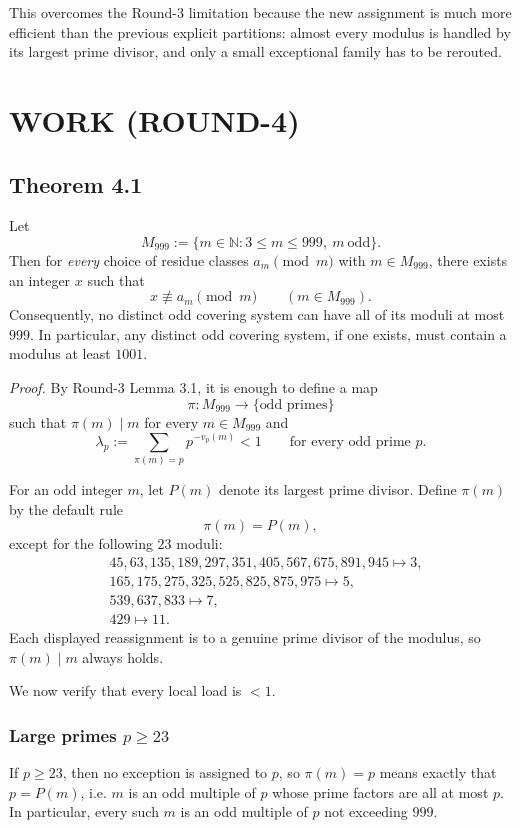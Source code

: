 This overcomes the Round-3 limitation because the new assignment is much more efficient than the previous explicit partitions: almost every modulus is handled by its largest prime divisor, and only a small exceptional family has to be rerouted.

\section{WORK (ROUND-4)}

\subsection*{Theorem 4.1}
Let
\[
M_{999}:=\{m\in \mathbb N : 3\le m\le 999,\ m\ \text{odd}\}.
\]
Then for \emph{every} choice of residue classes \(a_m \pmod m\) with \(m\in M_{999}\), there exists an integer \(x\) such that
\[
x \not\equiv a_m \pmod m \qquad (m\in M_{999}).
\]
Consequently, no distinct odd covering system can have all of its moduli at most \(999\). In particular, any distinct odd covering system, if one exists, must contain a modulus at least \(1001\).

\medskip
\noindent\emph{Proof.}
By Round-3 Lemma 3.1, it is enough to define a map
\[
\pi:M_{999}\to \{\text{odd primes}\}
\]
such that \(\pi(m)\mid m\) for every \(m\in M_{999}\) and
\[
\lambda_p:=\sum_{\pi(m)=p} p^{-v_p(m)} < 1
\qquad\text{for every odd prime }p.
\]

For an odd integer \(m\), let \(P(m)\) denote its largest prime divisor. Define \(\pi(m)\) by the default rule
\[
\pi(m)=P(m),
\]
except for the following \(23\) moduli:
\[
\begin{aligned}
&45,63,135,189,297,351,405,567,675,891,945 \mapsto 3,\\
&165,175,275,325,525,825,875,975 \mapsto 5,\\
&539,637,833 \mapsto 7,\\
&429 \mapsto 11.
\end{aligned}
\]
Each displayed reassignment is to a genuine prime divisor of the modulus, so \(\pi(m)\mid m\) always holds.

We now verify that every local load is \(<1\).

\subsubsection*{Large primes \(p\ge 23\)}
If \(p\ge 23\), then no exception is assigned to \(p\), so \(\pi(m)=p\) means exactly that \(p=P(m)\), i.e. \(m\) is an odd multiple of \(p\) whose prime factors are all at most \(p\). In particular, every such \(m\) is an odd multiple of \(p\) not exceeding \(999\).

